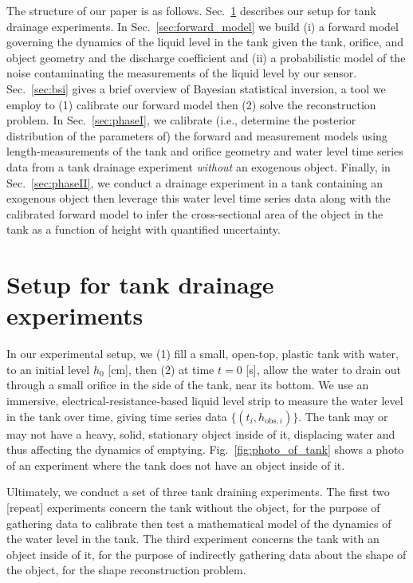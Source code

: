 \documentclass[openacc]{rsproca_new}%
\begin{document}
The structure of our paper is as follows. Sec.~\ref{sec:expt} describes our setup for tank drainage experiments.
In Sec.~\ref{sec:forward_model} we build (i) a forward model governing the dynamics of the liquid level in the tank given the tank, orifice, and object geometry and the discharge coefficient and (ii) a probabilistic model of the noise contaminating the measurements of the liquid level by our sensor.
Sec.~\ref{sec:bsi} gives a brief overview of Bayesian statistical inversion, a tool we employ to (1) calibrate our forward model then (2) solve the reconstruction problem.
In Sec.~\ref{sec:phaseI}, we calibrate (i.e., determine the posterior distribution of the parameters of) the forward and measurement models using length-measurements of the tank and orifice geometry and water level time series data from a tank drainage experiment \emph{without} an exogenous object. 
Finally, in Sec.~\ref{sec:phaseII}, we conduct a drainage experiment in a tank containing an exogenous object then leverage this water level time series data along with the calibrated forward model to infer the cross-sectional area of the object in the tank as a function of height with quantified uncertainty.



\section{Setup for tank drainage experiments} \label{sec:expt}
In our experimental setup, we (1) fill a small, open-top, plastic tank with water, to an initial level $h_0$ [cm], then (2) at time $t=0$ [s], allow the water to drain out through a small orifice in the side of the tank, near its bottom. 
We use an immersive, electrical-resistance-based liquid level strip to measure the water level in the tank over time, giving time series data $\{(t_i, h_{\text{obs}, i}) \}$. The tank may or may not have a heavy, solid, stationary object inside of it, displacing water and thus affecting the dynamics of emptying. Fig.~\ref{fig:photo_of_tank} shows a photo of an experiment where the tank does not have an object inside of it.

Ultimately, we conduct a set of three tank draining experiments. The first two [repeat] experiments concern the tank without the object, for the purpose of gathering data to calibrate then test a mathematical model of the dynamics of the water level in the tank. The third experiment concerns the tank with an object inside of it, for the purpose of indirectly gathering data about the shape of the object, for the shape reconstruction problem.
\end{document}
